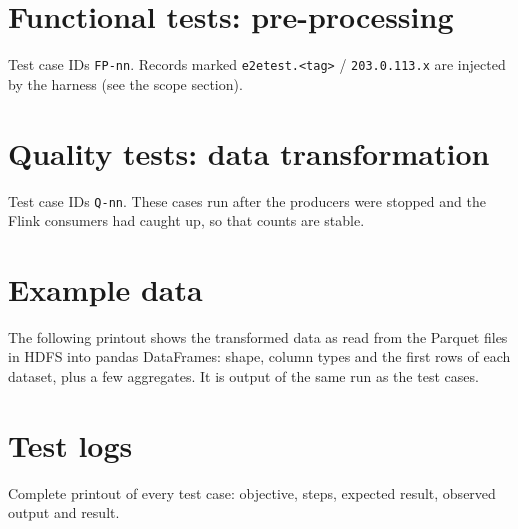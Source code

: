 \documentclass[11pt,a4paper]{article}
\begin{document}


\section{Functional tests: pre-processing}
Test case IDs \texttt{FP-nn}. Records marked \texttt{e2etest.<tag>} / \texttt{203.0.113.x} are injected by the harness (see the scope section).



\section{Quality tests: data transformation}
Test case IDs \texttt{Q-nn}. These cases run after the producers were stopped and the Flink consumers had caught up, so that counts are stable.


\clearpage
\restoregeometry
\pdfpagewidth=21cm \pdfpageheight=29.7cm

\section{Example data}

The following printout shows the transformed data as read from the Parquet files in HDFS into pandas DataFrames: shape, column types and the
first rows of each dataset, plus a few aggregates. It is output of the same run as the test cases.



\appendix
\section{Test logs}

Complete printout of every test case: objective, steps, expected result, observed output and result.


\end{document}

